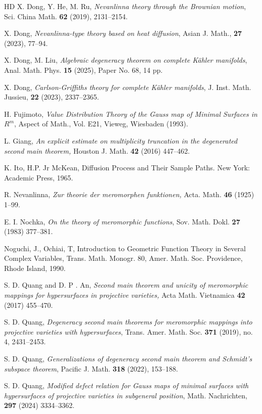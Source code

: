 \documentclass[12pt]{amsart}
\begin{document}
\begin{thebibliography}{HD}
 X. Dong, Y. He, M. Ru, \textit{Nevanlinna theory through the Brownian motion}, Sci. China Math. \textbf{62} (2019), 2131--2154.

 X. Dong, \textit{Nevanlinna-type theory based on heat diffusion}, Asian J. Math., \textbf{27} (2023), 77--94.

 X. Dong, M. Liu, \textit{Algebraic degeneracy theorem on complete K\"{a}hler manifolds}, Anal. Math. Phys. \textbf{15} (2025), Paper No. 68, 14 pp.

 X. Dong, \textit{Carlson-Griffiths theory for complete K\"{a}hler manifolds}, J. Inst. Math. Jussieu, \textbf{22} (2023), 2337--2365.

 H. Fujimoto, \textit{Value Distribution Theory of the Gauss map of Minimal Surfaces in $R^m$}, Aspect of Math., Vol. E21, Vieweg, Wiesbaden (1993).

 L. Giang, \textit{An explicit estimate on multiplicity truncation in the degenerated second main theorem,} Houston J. Math. \textbf{42} (2016) 447--462.

 K. Ito, H.P. Jr McKean, Diffusion Process and Their Sample Paths. New York: Academic Press, 1965.

 R. Nevanlinna, {\it Zur theorie der meromorphen funktionen,} Acta. Math. {\bf 46} (1925) 1--99.

 E. I. Nochka, \textit{On the theory of meromorphic functions}, Sov. Math. Dokl. \textbf{27} (1983) 377--381.

 Noguchi, J., Ochiai, T, Introduction to Geometric Function Theory in Several Complex Variables, Trans. Math. Monogr. 80, Amer. Math. Soc. Providence, Rhode Island, 1990.

 S. D. Quang and D. P . An, \textit{Second main theorem and unicity of meromorphic mappings for hypersurfaces in projective varieties,} Acta Math. Vietnamica \textbf{42} (2017) 455--470.

 S. D. Quang, \textit{Degeneracy second main theorems for meromorphic mappings into projective varieties with hypersurfaces}, Trans. Amer. Math. Soc. \textbf{371} (2019), no. 4, 2431--2453.

 S. D. Quang, {\it Generalizations of degeneracy second main theorem and Schmidt's subspace theorem}, Pacific J. Math. \textbf{318} (2022), 153--188.

 S. D. Quang, {\it Modified defect relation for Gauss maps of minimal surfaces with hypersurfaces of projective varieties in subgeneral position}, Math. Nachrichten, \textbf{297} (2024) 3334--3362.


\end{thebibliography}
\end{document}
